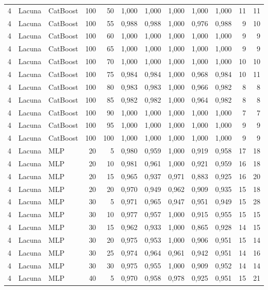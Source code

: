 \begin{longtable}{@{}rllrrrrrrrrr@{}}
4 & Lacuna & CatBoost & 100 & 50 & 1,000 & 1,000 & 1,000 & 1,000 & 1,000 & 11 & 11 \\
4 & Lacuna & CatBoost & 100 & 55 & 0,988 & 0,988 & 1,000 & 0,976 & 0,988 & 9 & 10 \\
4 & Lacuna & CatBoost & 100 & 60 & 1,000 & 1,000 & 1,000 & 1,000 & 1,000 & 9 & 9 \\
4 & Lacuna & CatBoost & 100 & 65 & 1,000 & 1,000 & 1,000 & 1,000 & 1,000 & 9 & 9 \\
4 & Lacuna & CatBoost & 100 & 70 & 1,000 & 1,000 & 1,000 & 1,000 & 1,000 & 10 & 10 \\
4 & Lacuna & CatBoost & 100 & 75 & 0,984 & 0,984 & 1,000 & 0,968 & 0,984 & 10 & 11 \\
4 & Lacuna & CatBoost & 100 & 80 & 0,983 & 0,983 & 1,000 & 0,966 & 0,982 & 8 & 8 \\
4 & Lacuna & CatBoost & 100 & 85 & 0,982 & 0,982 & 1,000 & 0,964 & 0,982 & 8 & 8 \\
4 & Lacuna & CatBoost & 100 & 90 & 1,000 & 1,000 & 1,000 & 1,000 & 1,000 & 7 & 7 \\
4 & Lacuna & CatBoost & 100 & 95 & 1,000 & 1,000 & 1,000 & 1,000 & 1,000 & 9 & 9 \\
4 & Lacuna & CatBoost & 100 & 100 & 1,000 & 1,000 & 1,000 & 1,000 & 1,000 & 9 & 9 \\
4 & Lacuna & MLP & 20 & 5 & 0,980 & 0,959 & 1,000 & 0,919 & 0,958 & 17 & 18 \\
4 & Lacuna & MLP & 20 & 10 & 0,981 & 0,961 & 1,000 & 0,921 & 0,959 & 16 & 18 \\
4 & Lacuna & MLP & 20 & 15 & 0,965 & 0,937 & 0,971 & 0,883 & 0,925 & 16 & 20 \\
4 & Lacuna & MLP & 20 & 20 & 0,970 & 0,949 & 0,962 & 0,909 & 0,935 & 15 & 18 \\
4 & Lacuna & MLP & 30 & 5 & 0,971 & 0,965 & 0,947 & 0,951 & 0,949 & 15 & 28 \\
4 & Lacuna & MLP & 30 & 10 & 0,977 & 0,957 & 1,000 & 0,915 & 0,955 & 15 & 15 \\
4 & Lacuna & MLP & 30 & 15 & 0,962 & 0,933 & 1,000 & 0,865 & 0,928 & 14 & 15 \\
4 & Lacuna & MLP & 30 & 20 & 0,975 & 0,953 & 1,000 & 0,906 & 0,951 & 15 & 14 \\
4 & Lacuna & MLP & 30 & 25 & 0,974 & 0,964 & 0,961 & 0,942 & 0,951 & 14 & 16 \\
4 & Lacuna & MLP & 30 & 30 & 0,975 & 0,955 & 1,000 & 0,909 & 0,952 & 14 & 14 \\
4 & Lacuna & MLP & 40 & 5 & 0,970 & 0,958 & 0,978 & 0,925 & 0,951 & 15 & 21 \\

\end{longtable}
